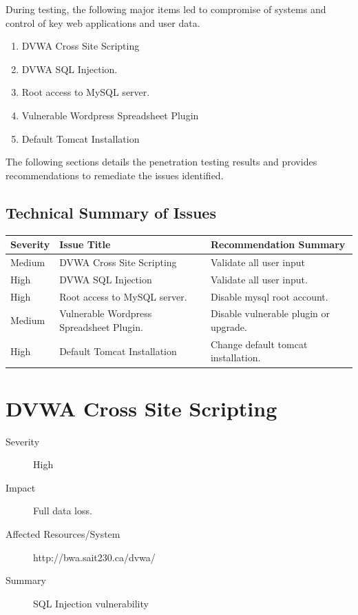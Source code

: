 \documentclass{article}
\begin{document}
During testing, the following major items led to compromise of systems and control
of key web applications and user data.

\begin{enumerate}
  \item DVWA Cross Site Scripting
  \item DVWA SQL Injection.
  \item Root access to MySQL server.
  \item Vulnerable Wordpress Spreadsheet Plugin
  \item Default Tomcat Installation
\end{enumerate}

The following sections details the penetration testing results and provides
recommendations to remediate the issues identified.

\subsection{Technical Summary of Issues}

\begin{center}
  \begin{tabular}{| l | l | | l |}
    \hline
    \textbf{Severity} & \textbf{Issue Title} & \textbf{Recommendation Summary} \\ \hline \hline
    Medium & DVWA Cross Site Scripting & Validate all user input \\ \hline
    High & DVWA SQL Injection & Validate all user input. \\ \hline
    High & Root access to MySQL server. & Disable mysql root account. \\ \hline
    Medium & Vulnerable Wordpress Spreadsheet Plugin. & Disable vulnerable plugin or upgrade. \\ \hline
    High & Default Tomcat Installation & Change default tomcat installation. \\ \hline
    \hline
  \end{tabular}
\end{center}

\newpage
\section{DVWA Cross Site Scripting}

\begin{description}
  \item[Severity] High
  \item[Impact] Full data loss.
  \item[Affected Resources/System] http://bwa.sait230.ca/dvwa/
  \item[Summary] SQL Injection vulnerability
\end{description}
\end{document}
